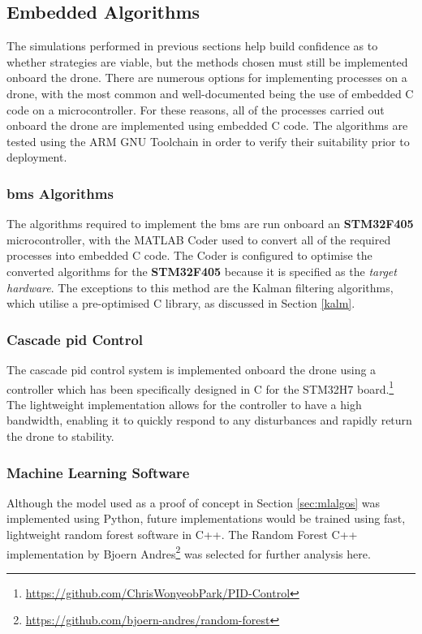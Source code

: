 \subsection{Embedded Algorithms}

The simulations performed in previous sections help build confidence as to whether strategies are viable, but the methods chosen must still be implemented onboard the drone. There are numerous options for implementing processes on a drone, with the most common and well-documented being the use of embedded C code on a microcontroller. For these reasons, all of the processes carried out onboard the drone are implemented using embedded C code. The algorithms are tested using the ARM GNU Toolchain in order to verify their suitability prior to deployment.

\subsubsection{\gls{bms} Algorithms}

The algorithms required to implement the \gls{bms} are run onboard an \textbf{STM32F405} microcontroller, with the MATLAB Coder used to convert all of the required processes into embedded C code. The Coder is configured to optimise the converted algorithms for the \textbf{STM32F405} because it is specified as the \textit{target hardware}. The exceptions to this method are the Kalman filtering algorithms, which utilise a pre-optimised C library, as discussed in Section \ref{kalm}. 

\subsubsection{Cascade \gls{pid} Control}

The cascade \gls{pid} control system is implemented onboard the drone using a controller which has been specifically designed in C for the STM32H7 board.\footnote{\url{https://github.com/ChrisWonyeobPark/PID-Control}} The lightweight implementation allows for the controller to have a high bandwidth, enabling it to quickly respond to any disturbances and rapidly return the drone to stability.

\subsubsection{Machine Learning Software}

Although the model used as a proof of concept in Section \ref{sec:mlalgos} was implemented using Python, future implementations would be trained using fast, lightweight random forest software in C++. The Random Forest C++ implementation by Bjoern Andres\footnote{\url{https://github.com/bjoern-andres/random-forest}} was selected for further analysis here. 

